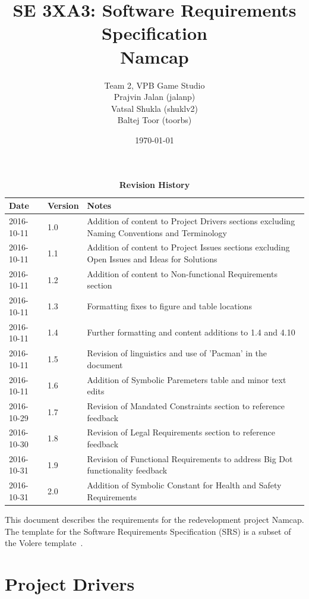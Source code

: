 \documentclass[12pt, titlepage]{article}
\title{SE 3XA3: Software Requirements Specification\\Namcap}
\author{Team 2, VPB Game Studio
		\\ Prajvin Jalan (jalanp)
		\\ Vatsal Shukla (shuklv2)
		\\ Baltej Toor (toorbs)
}
\date{\today}
\begin{document}
\maketitle

\tableofcontents
\listoftables
\listoffigures

\newpage

\begin{table}[H]
\caption{\bf Revision History}
\begin{tabularx}{\textwidth}{p{3cm}p{2cm}X}
\toprule {\bf Date} & {\bf Version} & {\bf Notes}\\
\midrule
2016-10-11 & 1.0 & Addition of content to Project Drivers sections excluding Naming Conventions and Terminology\\
2016-10-11 & 1.1 & Addition of content to Project Issues sections excluding Open Issues and Ideas for Solutions\\
2016-10-11 & 1.2 & Addition of content to Non-functional Requirements section\\
2016-10-11 & 1.3 & Formatting fixes to figure and table locations\\
2016-10-11 & 1.4 & Further formatting and content additions to 1.4 and 4.10\\
2016-10-11 & 1.5 & Revision of linguistics and use of 'Pacman' in the document\\
2016-10-11 & 1.6 & Addition of Symbolic Paremeters table and minor text edits\\
2016-10-29 & 1.7 & Revision of Mandated Constraints section to reference feedback\\
2016-10-30 & 1.8 & Revision of Legal Requirements section to reference feedback\\
2016-10-31 & 1.9 & Revision of Functional Requirements to address Big Dot functionality feedback\\
2016-10-31 & 2.0 & Addition of Symbolic Constant for Health and Safety Requirements\\
\bottomrule
\end{tabularx}
\end{table}

\newpage


This document describes the requirements for the redevelopment project Namcap.  The template for the Software
Requirements Specification (SRS) is a subset of the Volere
template~\citep{RobertsonAndRobertson2012}.

\section{Project Drivers}
\end{document}
